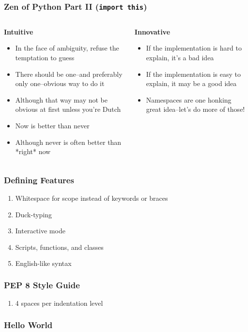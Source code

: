 \documentclass{beamer}
\begin{document}
  \begin{frame}
    \frametitle{Zen of Python Part II (\texttt{import this})}
    \begin{columns}
      \begin{column}{0.60\textwidth}
	\textbf{Intuitive}
        \begin{itemize}
          \item In the face of ambiguity, refuse the temptation to guess
          \item There should be one--and preferably only one--obvious way to do it
	  \item Although that way may not be obvious at first unless you're Dutch
	  \item Now is better than never
          \item Although never is often better than *right* now
        \end{itemize}
      \end{column}
      \begin{column}{0.40\textwidth}
        \textbf{Innovative}
        \begin{itemize}
       	  \item If the implementation is hard to explain, it's a bad idea
	  \item If the implementation is easy to explain, it may be a good idea
	  \item Namespaces are one honking great idea--let's do more of those!
        \end{itemize}
      \end{column}
    \end{columns}
  \end{frame}

  \begin{frame}
    \frametitle{Defining Features}
    \begin{enumerate}
      \item Whitespace for scope instead of keywords or braces
      \item Duck-typing
      \item Interactive mode
      \item Scripts, functions, and classes
      \item English-like syntax
    \end{enumerate}
  \end{frame}

  \begin{frame}
    \frametitle{PEP 8 Style Guide}
    \begin{enumerate}
      \item 4 spaces per indentation level
    \end{enumerate}
  \end{frame}

  \begin{frame}
    \frametitle{Hello World}
    \inputminted{python}{hello.py}
  \end{frame}
    
\end{document}
